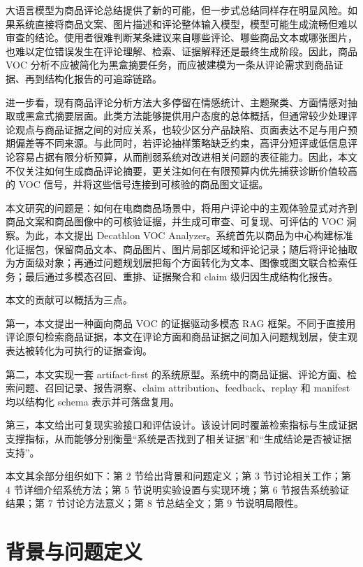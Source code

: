 \documentclass[11pt]{article}
\begin{document}
大语言模型为商品评论总结提供了新的可能，但一步式总结同样存在明显风险。如果系统直接将商品文案、图片描述和评论整体输入模型，模型可能生成流畅但难以审查的结论。使用者很难判断某条建议来自哪些评论、哪些商品文本或哪张图片，也难以定位错误发生在评论理解、检索、证据解释还是最终生成阶段。因此，商品 VOC 分析不应被简化为黑盒摘要任务，而应被建模为一条从评论需求到商品证据、再到结构化报告的可追踪链路。

进一步看，现有商品评论分析方法大多停留在情感统计、主题聚类、方面情感对抽取或黑盒式摘要层面。此类方法能够提供用户态度的总体概括，但通常较少处理评论观点与商品证据之间的对应关系，也较少区分产品缺陷、页面表达不足与用户预期偏差等不同来源。与此同时，若评论抽样策略缺乏约束，高评分短评或低信息评论容易占据有限分析预算，从而削弱系统对改进相关问题的表征能力。因此，本文不仅关注如何生成商品评论摘要，更关注如何在有限预算内优先捕获诊断价值较高的 VOC 信号，并将这些信号连接到可核验的商品图文证据。

本文研究的问题是：如何在电商商品场景中，将用户评论中的主观体验显式对齐到商品文案和商品图像中的可核验证据，并生成可审查、可复现、可评估的 VOC 洞察。为此，本文提出 Decathlon VOC Analyzer。系统首先以商品为中心构建标准化证据包，保留商品文本、商品图片、图片局部区域和评论记录；随后将评论抽取为方面级对象；再通过问题规划层把每个方面转化为文本、图像或图文联合检索任务；最后通过多模态召回、重排、证据聚合和 claim 级归因生成结构化报告。

本文的贡献可以概括为三点。

第一，本文提出一种面向商品 VOC 的证据驱动多模态 RAG 框架。不同于直接用评论原句检索商品证据，本文在评论方面和商品证据之间加入问题规划层，使主观表达被转化为可执行的证据查询。

第二，本文实现一套 artifact-first 的系统原型。系统中的商品证据、评论方面、检索问题、召回记录、报告洞察、claim attribution、feedback、replay 和 manifest 均以结构化 schema 表示并可落盘复用。

第三，本文给出可复现实验接口和评估设计。该设计同时覆盖检索指标与生成证据支撑指标，从而能够分别衡量``系统是否找到了相关证据''和``生成结论是否被证据支持''。

本文其余部分组织如下：第 2 节给出背景和问题定义；第 3 节讨论相关工作；第 4 节详细介绍系统方法；第 5 节说明实验设置与实现环境；第 6 节报告系统验证结果；第 7 节讨论方法意义；第 8 节总结全文；第 9 节说明局限性。

\section{背景与问题定义}
\end{document}
